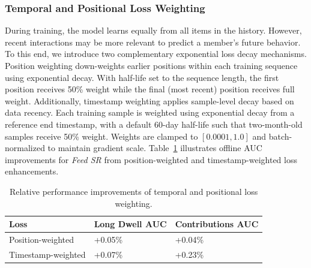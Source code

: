 \documentclass[sigconf]{acmart}
\newcommand{\systemname}{\textit{Feed SR}}
\begin{document}
\subsubsection{Temporal and Positional Loss Weighting}\label{sec:loss-engineering}
During training, the model learns equally from all items in the history. However, recent interactions may be more relevant to predict a member's future behavior. To this end, we introduce two complementary exponential loss decay mechanisms. Position weighting down-weights earlier positions within each training sequence using exponential decay. With half-life set to the sequence length, the first position receives 50\% weight while the final (most recent) position receives full weight. Additionally, timestamp weighting applies sample-level decay based on data recency. Each training sample is weighted using exponential decay from a reference end timestamp, with a default 60-day half-life such that two-month-old samples receive 50\% weight. Weights are clamped to $[0.0001, 1.0]$ and batch-normalized to maintain gradient scale. Table~\ref{tab:loss-engineering} illustrates offline AUC improvements for {\systemname} from position-weighted and timestamp-weighted loss enhancements.

\begin{table}[htbp]
\centering
\begin{tabular}{@{}lll@{}}
\toprule
Loss & Long Dwell AUC & Contributions AUC \\ \midrule
Position-weighted          & +0.05\%   & +0.04\%  \\
Timestamp-weighted          & +0.07\%   & +0.23\%  \\ \bottomrule
\end{tabular}
\caption{Relative performance improvements of temporal and positional loss weighting.}
\label{tab:loss-engineering}
\vspace{-2.5em}
\end{table}
\end{document}
